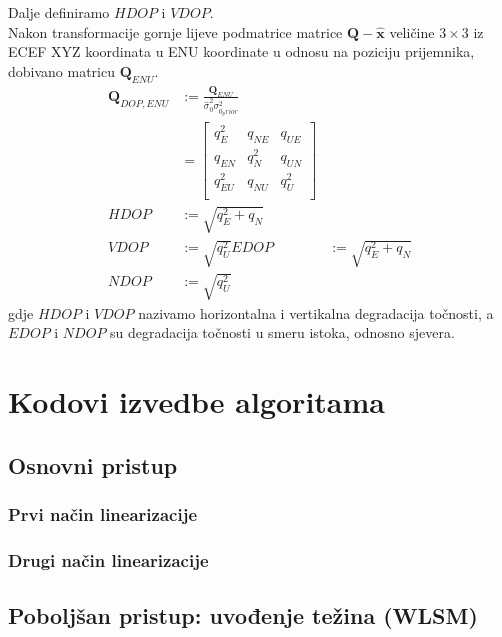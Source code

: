 \documentclass[a4paper,twoside,12pt]{memoir} %
\begin{document}
Dalje definiramo $HDOP$ i $VDOP$. \\
Nakon transformacije gornje lijeve podmatrice matrice $\mathbf{Q-{\hat{x}}}$ veličine $3 \times 3$ iz ECEF XYZ koordinata u ENU koordinate u odnosu na poziciju prijemnika, dobivano matricu $\mathbf{Q}_{ENU}$.
\begin{align}
\mathbf{Q}_{DOP,ENU} & := \frac{\mathbf{Q}_{ENU}}{\hat{\sigma}_0^2 \sigma_{0_prior}^2} \\
&=\begin{bmatrix}
q_E^2 & q_{NE} & q_{UE} \\
q_{EN} & q_{N}^2 & q_{UN} \\
q_{EU}^2 & q_{NU} & q_{U}^2 \\
\end{bmatrix}\\
HDOP & := \sqrt{q_E^2 + q_{N}} \\
VDOP & := \sqrt{q_U^2}
EDOP & := \sqrt{q_E^2 + q_{N}} \\
NDOP & := \sqrt{q_U^2}
\end{align}
gdje $HDOP$ i $VDOP$ nazivamo horizontalna i vertikalna degradacija točnosti, a
$EDOP$ i $NDOP$ su degradacija točnosti u smeru istoka, odnosno sjevera.

\chapter{Kodovi izvedbe algoritama}\label{appendix:izvedba}
\section{Osnovni pristup}
\subsection{Prvi način linearizacije}
\subsection{Drugi način linearizacije}
\section{Poboljšan pristup: uvođenje težina (WLSM)}
\end{document}
